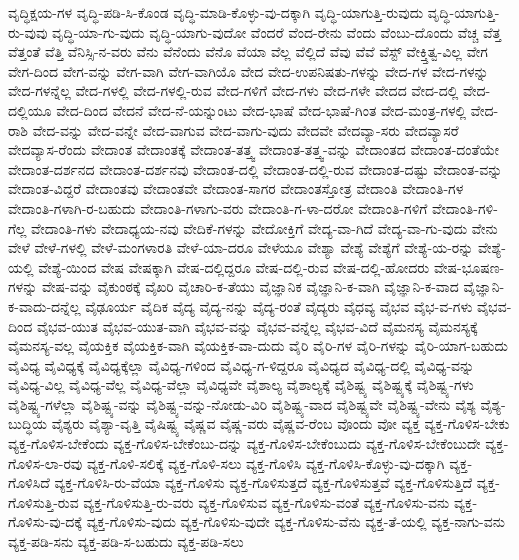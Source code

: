 {ವೃದ್ಧಿಕ್ಷಯ-ಗಳ
ವೃದ್ಧಿ-ಪಡಿ-ಸಿ-ಕೊಂಡ
ವೃದ್ಧಿ-ಮಾಡಿ-ಕೊಳ್ಳು-ವು-ದಕ್ಕಾಗಿ
ವೃದ್ಧಿ-ಯಾಗುತ್ತಿ-ರುವುದು
ವೃದ್ಧಿ-ಯಾಗುತ್ತಿ-ರು-ವುವು
ವೃದ್ಧಿ-ಯಾ-ಗು-ವುದು
ವೃದ್ಧಿ-ಯಾಗು-ವುದೋ
ವೆಂದರೆ
ವೆಂದ-ರೇನು
ವೆಂದು
ವೆಂಬು-ದೊಂದು
ವೆಚ್ಚ
ವೆತ್ತ
ವೆತ್ತಂತೆ
ವೆತ್ತಿ
ವೆನಿಸ್ಸಿ-ನ-ವರು
ವೆನು
ವೆನೆಂದು
ವೆನೊ
ವೆಯಾ
ವೆಲ್ಲ
ವೆಲ್ಲಿದೆ
ವೆವು
ವೆವೆ
ವೆಸ್ಟ್
ವೇಕ್ತ್ತಿತ್ವ-ವಿಲ್ಲ
ವೇಗ
ವೇಗ-ದಿಂದ
ವೇಗ-ವನ್ನು
ವೇಗ-ವಾಗಿ
ವೇಗ-ವಾಗಿಯೊ
ವೇದ
ವೇದ-ಉಪನಿಷತು-ಗಳನ್ನು
ವೇದ-ಗಳ
ವೇದ-ಗಳನ್ನು
ವೇದ-ಗಳನ್ನೆಲ್ಲ
ವೇದ-ಗಳಲ್ಲಿ
ವೇದ-ಗಳಲ್ಲಿ-ರುವ
ವೇದ-ಗಳಿಗೆ
ವೇದ-ಗಳು
ವೇದ-ಗಳೇ
ವೇದದ
ವೇದ-ದಲ್ಲಿ
ವೇದ-ದಲ್ಲಿಯೂ
ವೇದ-ದಿಂದ
ವೇದನೆ
ವೇದ-ನೆ-ಯನ್ನುಂಟು
ವೇದ-ಭಾಷೆ
ವೇದ-ಭಾಷೆ-ಗಿಂತ
ವೇದ-ಮಂತ್ರ-ಗಳಲ್ಲಿ
ವೇದ-ರಾಶಿ
ವೇದ-ವನ್ನು
ವೇದ-ವನ್ನೇ
ವೇದ-ವಾಗುವ
ವೇದ-ವಾಗು-ವುದು
ವೇದವೇ
ವೇದವ್ಯಾ-ಸರು
ವೇದವ್ಯಾಸರೆ
ವೇದವ್ಯಾಸ-ರೆಂದು
ವೇದಾಂತ
ವೇದಾಂತಕ್ಕೆ
ವೇದಾಂತ-ತತ್ತ್ವ
ವೇದಾಂತ-ತತ್ತ್ವ-ವನ್ನು
ವೇದಾಂತದ
ವೇದಾಂತ-ದಂತೆಯೇ
ವೇದಾಂತ-ದರ್ಶನದ
ವೇದಾಂತ-ದರ್ಶನವು
ವೇದಾಂತ-ದಲ್ಲಿ
ವೇದಾಂತ-ದಲ್ಲಿ-ರುವ
ವೇದಾಂತ-ದಷ್ಟು
ವೇದಾಂತ-ವನ್ನು
ವೇದಾಂತ-ವಿದ್ದರೆ
ವೇದಾಂತವು
ವೇದಾಂತವೇ
ವೇದಾಂತ-ಸಾಗರ
ವೇದಾಂತಸ್ತೋತ್ರ
ವೇದಾಂತಿ
ವೇದಾಂತಿ-ಗಳ
ವೇದಾಂತಿ-ಗಳಾಗಿ-ರ-ಬಹುದು
ವೇದಾಂತಿ-ಗಳಾಗು-ವರು
ವೇದಾಂತಿ-ಗ-ಳಾ-ದರೋ
ವೇದಾಂತಿ-ಗಳಿಗೆ
ವೇದಾಂತಿ-ಗಳಿ-ಗೆಲ್ಲ
ವೇದಾಂತಿ-ಗಳು
ವೇದಾಧ್ಯಯ-ನವು
ವೇದಿಕೆ-ಗಳನ್ನು
ವೇದೋಕ್ತಿಗೆ
ವೇದ್ಯ-ವಾ-ಗಿದೆ
ವೇದ್ಯ-ವಾ-ಗು-ವುದು
ವೇನು
ವೇಳೆ
ವೇಳೆ-ಗಳಲ್ಲಿ
ವೇಳೆ-ಮಂಗಳಾರತಿ
ವೇಳೆ-ಯಾ-ದರೂ
ವೇಳೆಯೂ
ವೇಶ್ಯಾ
ವೇಶ್ಯೆ
ವೇಶ್ಯೆಗೆ
ವೇಶ್ಯೆ-ಯ-ರನ್ನು
ವೇಶ್ಯೆ-ಯಲ್ಲಿ
ವೇಶ್ಯೆ-ಯಿಂದ
ವೇಷ
ವೇಷಕ್ಕಾಗಿ
ವೇಷ-ದಲ್ಲಿದ್ದರೂ
ವೇಷ-ದಲ್ಲಿ-ರುವ
ವೇಷ-ದಲ್ಲಿ-ಹೋದರು
ವೇಷ-ಭೂಷಣ-ಗಳನ್ನು
ವೇಷ-ವನ್ನು
ವೈಕುಂಠಕ್ಕೆ
ವೈಖರಿ
ವೈಚಾರಿ-ಕ-ತೆಯು
ವೈಜ್ಞಾನಿಕ
ವೈಜ್ಞಾನಿ-ಕ-ವಾಗಿ
ವೈಜ್ಞಾನಿ-ಕ-ವಾದ
ವೈಜ್ಞಾನಿ-ಕ-ವಾದು-ದನ್ನೆಲ್ಲ
ವೈಢೂರ್ಯ
ವೈದಿಕ
ವೈದ್ಯ
ವೈದ್ಯ-ನನ್ನು
ವೈದ್ಯ-ರಂತೆ
ವೈದ್ಯರು
ವೈಧವ್ಯ
ವೈಭವ
ವೈಭ-ವ-ಗಳು
ವೈಭವ-ದಿಂದ
ವೈಭವ-ಯುತ
ವೈಭವ-ಯುತ-ವಾಗಿ
ವೈಭವ-ವನ್ನು
ವೈಭವ-ವನ್ನೆಲ್ಲ
ವೈಭವ-ವಿದೆ
ವೈಮನಸ್ಯ
ವೈಮನಸ್ಯಕ್ಕೆ
ವೈಮನಸ್ಯ-ವಲ್ಲ
ವೈಯಕ್ತಿಕ
ವೈಯಕ್ತಿಕ-ವಾಗಿ
ವೈಯಕ್ತಿಕ-ವಾ-ದುದು
ವೈರಿ
ವೈರಿ-ಗಳ
ವೈರಿ-ಗಳನ್ನು
ವೈರಿ-ಯಾಗ-ಬಹುದು
ವೈವಿಧ್ಯ
ವೈವಿಧ್ಯಕ್ಕೆ
ವೈವಿಧ್ಯಕ್ಕೆಲ್ಲಾ
ವೈವಿಧ್ಯ-ಗಳಿಂದ
ವೈವಿಧ್ಯ-ಗ-ಳಿದ್ದರೂ
ವೈವಿಧ್ಯದ
ವೈವಿಧ್ಯ-ದಲ್ಲಿ
ವೈವಿಧ್ಯ-ವನ್ನು
ವೈವಿಧ್ಯ-ವಿಲ್ಲ
ವೈವಿಧ್ಯ-ವೆಲ್ಲ
ವೈವಿಧ್ಯ-ವೆಲ್ಲಾ
ವೈವಿಧ್ಯವೇ
ವೈಶಾಲ್ಯ
ವೈಶಾಲ್ಯಕ್ಕೆ
ವೈಶಿಷ್ಟ್ಯ
ವೈಶಿಷ್ಟ್ಯಕ್ಕೆ
ವೈಶಿಷ್ಟ್ಯ-ಗಳು
ವೈಶಿಷ್ಟ್ಯ-ಗಳೆಲ್ಲಾ
ವೈಶಿಷ್ಟ್ಯ-ವನ್ನು
ವೈಶಿಷ್ಟ್ಯ-ವನ್ನು-ನೋಡು-ವಿರಿ
ವೈಶಿಷ್ಟ್ಯ-ವಾದ
ವೈಶಿಷ್ಟ್ಯವೇ
ವೈಶಿಷ್ಟ್ಯ-ವೇನು
ವೈಶ್ಯ
ವೈಶ್ಯ-ಬುದ್ಧಿಯ
ವೈಶ್ಯರು
ವೈಶ್ಯಾ-ವೃತ್ತಿ
ವೈಷಿಷ್ಟ್ಯ
ವೈಷ್ಣವ
ವೈಷ್ಣ-ವರು
ವೈಷ್ಣವ-ರೆಂಬ
ವೊಂದು
ವೋ
ವ್ಯಕ್ತ
ವ್ಯಕ್ತ-ಗೊಳಿಸ-ಬೇಕು
ವ್ಯಕ್ತ-ಗೊಳಿಸ-ಬೇಕೆಂದು
ವ್ಯಕ್ತ-ಗೊಳಿಸ-ಬೇಕೆಂಬು-ದನ್ನು
ವ್ಯಕ್ತ-ಗೊಳಿಸ-ಬೇಕೆಂಬುದು
ವ್ಯಕ್ತ-ಗೊಳಿಸ-ಬೇಕೆಂಬುದೇ
ವ್ಯಕ್ತ-ಗೊಳಿಸ-ಲಾ-ರವು
ವ್ಯಕ್ತ-ಗೊಳಿ-ಸಲಿಕ್ಕೆ
ವ್ಯಕ್ತ-ಗೊಳಿ-ಸಲು
ವ್ಯಕ್ತ-ಗೊಳಿಸಿ
ವ್ಯಕ್ತ-ಗೊಳಿಸಿ-ಕೊಳ್ಳು-ವು-ದಕ್ಕಾಗಿ
ವ್ಯಕ್ತ-ಗೊಳಿಸಿದೆ
ವ್ಯಕ್ತ-ಗೊಳಿಸಿ-ರು-ವೆಯಾ
ವ್ಯಕ್ತ-ಗೊಳಿಸು
ವ್ಯಕ್ತ-ಗೊಳಿಸುತ್ತದೆ
ವ್ಯಕ್ತ-ಗೊಳಿಸುತ್ತವೆ
ವ್ಯಕ್ತ-ಗೊಳಿಸುತ್ತಿದೆ
ವ್ಯಕ್ತ-ಗೊಳಿಸುತ್ತಿ-ರುವ
ವ್ಯಕ್ತ-ಗೊಳಿಸುತ್ತಿ-ರು-ವರು
ವ್ಯಕ್ತ-ಗೊಳಿಸುವ
ವ್ಯಕ್ತ-ಗೊಳಿಸು-ವಂತೆ
ವ್ಯಕ್ತ-ಗೊಳಿಸು-ವನು
ವ್ಯಕ್ತ-ಗೊಳಿಸು-ವು-ದಕ್ಕೆ
ವ್ಯಕ್ತ-ಗೊಳಿಸು-ವುದು
ವ್ಯಕ್ತ-ಗೊಳಿಸು-ವುದೇ
ವ್ಯಕ್ತ-ಗೊಳಿಸು-ವೆನು
ವ್ಯಕ್ತ-ತೆ-ಯಲ್ಲಿ
ವ್ಯಕ್ತ-ನಾಗು-ವನು
ವ್ಯಕ್ತ-ಪಡಿ-ಸನು
ವ್ಯಕ್ತ-ಪಡಿ-ಸ-ಬಹುದು
ವ್ಯಕ್ತ-ಪಡಿ-ಸಲು
}
